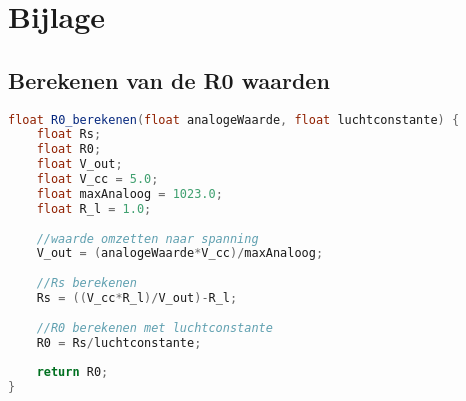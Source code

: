 
\chapter*{Bijlage}%
\label{ch:bijlage}

\section{Berekenen van de R0 waarden}
\label{lst:kalibratie}
\begin{lstlisting}[language=Java, caption={Berekenen van de R0 waarden}]
float R0_berekenen(float analogeWaarde, float luchtconstante) {
    float Rs;
    float R0;
    float V_out;
    float V_cc = 5.0;
    float maxAnaloog = 1023.0;
    float R_l = 1.0;
    
    //waarde omzetten naar spanning
    V_out = (analogeWaarde*V_cc)/maxAnaloog;
    
    //Rs berekenen
    Rs = ((V_cc*R_l)/V_out)-R_l;
    
    //R0 berekenen met luchtconstante
    R0 = Rs/luchtconstante;
    
    return R0;
}
\end{lstlisting}


